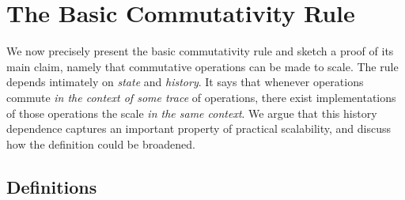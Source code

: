 
\section{The Basic Commutativity Rule}
\label{sec:rule}

We now precisely present the basic commutativity rule and sketch a
proof of its main claim, namely that commutative operations can be made
to scale.
%
The rule depends intimately on \emph{state} and \emph{history}.
%
It says that whenever operations commute \emph{in the context of some
trace} of operations, there exist implementations of those operations
the scale \emph{in the same context}.
%
We argue that this history dependence captures an important property of
practical scalability, and discuss how the definition could be
broadened.

\begin{comment}
To give a sense for how the connection between commutativity and
scalability might be formalized, this section provides a preliminary
definition of scalability, commutativity, and a rule that connects the
two.  While this makes our proposal more concrete, we hope to further
improve on these definitions and rules to make them easier to apply
in practice.

In this section, we start by first defining an abstract machine designed
to capture the primary factors in scalability on real hardware.
Then, we define commutativity in a way
that applies well to system calls with state-dependent behavior.  Finally,
our hypothesis connects the commutativity of interfaces with the
existence of implementations that scale linearly on the abstract
machine.
\end{comment}

\subsection{Definitions}
\label{pf}

\def\OP#1{\textsl{#1}}
\def\INV#1#2#3{\text{\OP{#1}}_{#3}(#2)}
\def\RES#1#2#3{\text{\OP{#1}}_{#3} \rightarrow #2}
\def\HRESTRICT#1#2{#1|#2}
\def\HIST#1{#1}
\def\LEGALHIST{\mathcal{H}}
\def\PARTIALHIST{\mathcal{P}}
\def\STEP{\rightarrow}
\def\TRUE{\textsc{true}}
\def\FALSE{\textsc{false}}
\def\OK{\textsc{ok}}
\def\FAIL{\textsc{fail}}
\def\qed{$\square$}

\begin{comment}
The abstract machine gives us a way to reason about when a particular
implementation scales, which, in turn, lets us weigh potential
implementations of an given interface.
In order to reason about when an interface's implementation \emph{can
  be} scalable, this section turns to \emph{commutativity}, an interface
design property that captures the inherent communication needs of an
interface's implementations.
\end{comment}

